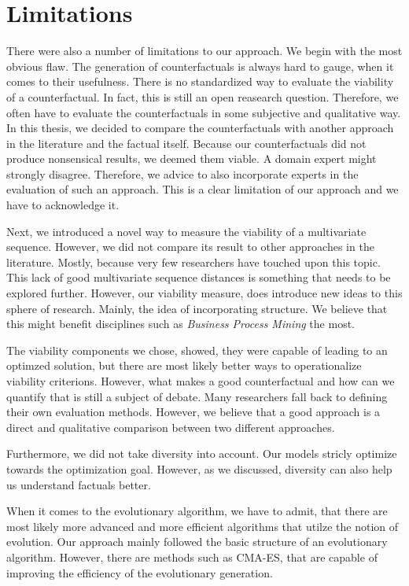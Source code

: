 \documentclass[12pt,a4paper]{report}
\begin{document}
\section{Limitations}
There were also a number of limitations to our approach. We begin with the most obvious flaw. The generation of counterfactuals is always hard to gauge, when it comes to their usefulness. There is no standardized way to evaluate the viability of a counterfactual. In fact, this is still an open reasearch question\autocites{hsieh_DiCE4ELInterpretingProcess_2021,mothilal_ExplainingMachineLearning_2020}. Therefore, we often have to evaluate the counterfactuals in some subjective and qualitative way. In this thesis, we decided to compare the counterfactuals with another approach in the literature and the factual itself. Because our counterfactuals did not produce nonsensical results, we deemed them viable. A domain expert might strongly disagree. Therefore, we advice to also incorporate experts in the evaluation of such an approach. This is a clear limitation of our approach and we have to acknowledge it. 

Next, we introduced a novel way to measure the viability of a multivariate sequence. However, we did not compare its result to other approaches in the literature. Mostly, because very few researchers have touched upon this topic. This lack of good multivariate sequence distances is something that needs to be explored further. However, our viability measure, does introduce new ideas to this sphere of research. Mainly, the idea of incorporating structure. We believe that this might benefit disciplines such as \emph{Business Process Mining} the most. 

The viability components we chose, showed, they were capable of leading to an optimzed solution, but there are most likely better ways to operationalize viability criterions. However, what makes a good counterfactual and how can we quantify that is still a subject of debate. Many researchers fall back to defining their own evaluation methods. However, we believe that a good approach is a direct and qualitative comparison between two different approaches.

Furthermore, we did not take diversity into account. Our models stricly optimize towards the optimization goal. However, as we discussed, diversity can also help us understand factuals better.

When it comes to the evolutionary algorithm, we have to admit, that there are most likely more advanced and more efficient algorithms that utilze the notion of evolution. Our approach mainly followed the basic structure of an evolutionary algorithm. However, there are methods such as CMA-ES, that are capable of improving the efficiency of the evolutionary generation. 
\end{document}
